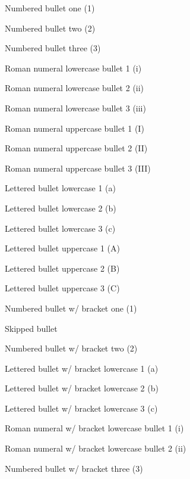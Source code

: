 \documentclass[11pt,a4paper]{article}
\begin{document}
Numbered bullet one (1)

Numbered bullet two (2)

Numbered bullet three (3)

Roman numeral lowercase bullet 1 (i)

Roman numeral lowercase bullet 2 (ii)

Roman numeral lowercase bullet 3 (iii)

Roman numeral uppercase bullet 1 (I)

Roman numeral uppercase bullet 2 (II)

Roman numeral uppercase bullet 3 (III)

Lettered bullet lowercase 1 (a)

Lettered bullet lowercase 2 (b)

Lettered bullet lowercase 3 (c)

Lettered bullet uppercase 1 (A)

Lettered bullet uppercase 2 (B)

Lettered bullet uppercase 3 (C)

Numbered bullet w/ bracket one (1)

Skipped bullet

Numbered bullet w/ bracket two (2)

Lettered bullet w/ bracket lowercase 1 (a)

Lettered bullet w/ bracket lowercase 2 (b)

Lettered bullet w/ bracket lowercase 3 (c)

Roman numeral w/ bracket lowercase bullet 1 (i)

Roman numeral w/ bracket lowercase bullet 2 (ii)

Numbered bullet w/ bracket three (3)
\end{document}
